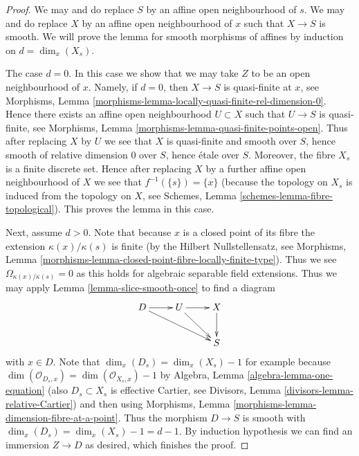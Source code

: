 \documentclass[10pt,a4paper]{amsart}
\theoremstyle{plain}
\theoremstyle{definition}
\theoremstyle{remark}
\numberwithin{equation}{subsection}
\begin{document}
\begin{proof}
We may and do replace $S$ by an affine open neighbourhood of $s$.
We may and do replace $X$ by an affine open neighbourhood of $x$
such that $X \to S$ is smooth.
We will prove the lemma for smooth morphisms of affines
by induction on $d = \dim_x(X_s)$.

\medskip\noindent
The case $d = 0$. In this case we show that we may take $Z$ to be
an open neighbourhood of $x$. Namely, if $d = 0$, then $X \to S$
is quasi-finite at $x$, see
Morphisms, Lemma \ref{morphisms-lemma-locally-quasi-finite-rel-dimension-0}.
Hence there exists an affine open neighbourhood $U \subset X$ such
that $U \to S$ is quasi-finite, see
Morphisms, Lemma \ref{morphisms-lemma-quasi-finite-points-open}.
Thus after replacing $X$ by $U$ we see that
$X$ is quasi-finite and smooth over $S$, hence
smooth of relative dimension $0$ over $S$, hence
\'etale over $S$. Moreover, the fibre $X_s$ is a finite
discrete set. Hence after replacing $X$ by a further affine open neighbourhood
of $X$ we see that $f^{-1}(\{s\}) = \{x\}$ (because the topology
on $X_s$ is induced from the topology on $X$, see
Schemes, Lemma \ref{schemes-lemma-fibre-topological}).
This proves the lemma in this case.

\medskip\noindent
Next, assume $d > 0$. Note that because $x$ is a closed point of its
fibre the extension $\kappa(x)/\kappa(s)$ is finite (by the
Hilbert Nullstellensatz, see
Morphisms, Lemma \ref{morphisms-lemma-closed-point-fibre-locally-finite-type}).
Thus we see $\Omega_{\kappa(x)/\kappa(s)} = 0$ as this holds for
algebraic separable field extensions.
Thus we may apply
Lemma \ref{lemma-slice-smooth-once}
to find a diagram
$$
\xymatrix{
D \ar[r] \ar[rrd] & U \ar[r] \ar[rd] & X \ar[d] \\
& & S
}
$$
with $x \in D$. Note that
$\dim_x(D_s) = \dim_x(X_s) - 1$ for example because
$\dim(\mathcal{O}_{D_s, x}) = \dim(\mathcal{O}_{X_s, x}) - 1$ by
Algebra, Lemma \ref{algebra-lemma-one-equation}
(also $D_s \subset X_s$ is effective Cartier, see
Divisors, Lemma \ref{divisors-lemma-relative-Cartier})
and then using
Morphisms, Lemma \ref{morphisms-lemma-dimension-fibre-at-a-point}.
Thus the morphism $D \to S$ is smooth with
$\dim_x(D_s) = \dim_x(X_s) - 1 = d - 1$. By induction hypothesis
we can find an immersion $Z \to D$ as desired, which finishes the proof.
\end{proof}
\end{document}
